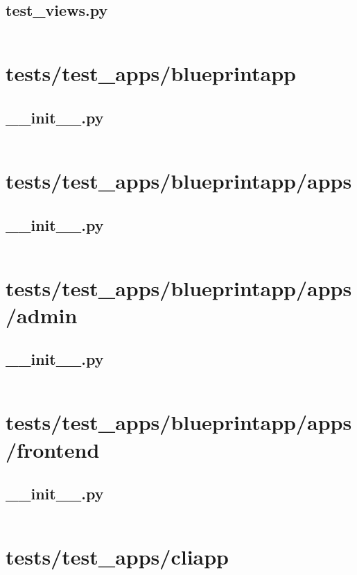 \documentclass{article}
\begin{document}
\subsection{test\_views.py}
\inputminted{python}{/tmp/flask/tests/test_views.py}
\newpage

\section{tests/test\_apps/blueprintapp}

\subsection{\_\_init\_\_.py}
\inputminted{python}{/tmp/flask/tests/test_apps/blueprintapp/__init__.py}
\newpage

\section{tests/test\_apps/blueprintapp/apps}

\subsection{\_\_init\_\_.py}
\inputminted{python}{/tmp/flask/tests/test_apps/blueprintapp/apps/__init__.py}
\newpage

\section{tests/test\_apps/blueprintapp/apps/admin}

\subsection{\_\_init\_\_.py}
\inputminted{python}{/tmp/flask/tests/test_apps/blueprintapp/apps/admin/__init__.py}
\newpage

\section{tests/test\_apps/blueprintapp/apps/frontend}

\subsection{\_\_init\_\_.py}
\inputminted{python}{/tmp/flask/tests/test_apps/blueprintapp/apps/frontend/__init__.py}
\newpage

\section{tests/test\_apps/cliapp}
\end{document}
